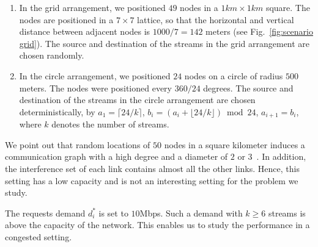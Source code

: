 \documentclass[12pt]{article}
\newenvironment{proof sketch}[1]{\noindent {\emph{Proof sketch of #1:}}}{\hfill \qed}
\begin{document}
\begin{enumerate}
\item In the grid arrangement, we positioned $49$ nodes in a
  $1km\times 1km$ square. The nodes are positioned in a $7\times 7$
  lattice, so that the horizontal and vertical distance between
  adjacent nodes is $1000/7=142$ meters (see Fig.~\ref{fig:scenario
    grid}).    The source and destination of the streams
  in the grid arrangement are chosen randomly.

\item In the circle arrangement, we positioned $24$ nodes on a circle
  of radius $500$ meters.  The nodes were positioned every $360/24$
  degrees. %
  The source and
  destination of the streams in the circle arrangement are chosen
  deterministically, by $a_1=\lceil 24/k \rceil$, $b_i=(a_i + \lfloor
  24/k \rfloor) \bmod 24$, $a_{i+1}=b_i$, where $k$ denotes the number of streams.
\end{enumerate}

We point out that random locations of $50$ nodes in a square kilometer
induces a communication graph with a high degree and a diameter of
$2$ or $3$~\cite{marina2010topology}. In addition, the interference set of
each link contains almost all the other links. Hence, this setting has a
low capacity and is not an interesting setting for the problem we
study.

The requests demand $d^*_i$ is set to $10$Mbps. Such a demand with
$k\geq 6$ streams is above the capacity of the network. This enables
us to study the performance in a congested setting.
\end{document}
